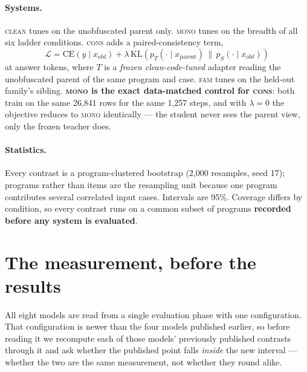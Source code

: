 \documentclass[sigconf,review,anonymous]{acmart}
\begin{document}
\paragraph{Systems.} \textsc{clean} tunes on the unobfuscated parent only. \textsc{mono} tunes on
the breadth of all six ladder conditions. \textsc{cons} adds a paired-consistency term,
\[
\mathcal{L} = \mathrm{CE}(y \mid x_{\text{obf}})
  + \lambda\,\mathrm{KL}\!\left(p_{T}(\cdot \mid x_{\text{parent}}) \,\|\, p_{S}(\cdot \mid x_{\text{obf}})\right)
\]
at answer tokens, where $T$ is a \emph{frozen clean-code-tuned} adapter reading the unobfuscated
parent of the same program and case. \textsc{fam} tunes on the held-out family's sibling.
\textbf{\textsc{mono} is the exact data-matched control for \textsc{cons}}: both train on the same
26{,}841 rows for the same 1{,}257 steps, and with $\lambda=0$ the objective reduces to
\textsc{mono} identically --- the student never sees the parent view, only the frozen teacher does.

\paragraph{Statistics.} Every contrast is a program-clustered bootstrap (2{,}000 resamples, seed
17); programs rather than items are the resampling unit because one program contributes several
correlated input cases. Intervals are 95\%. Coverage differs by condition, so every contrast runs
on a common subset of programs \textbf{recorded before any system is evaluated}.

\section{The measurement, before the results}
\label{sec:grid}

All eight models are read from a single evaluation phase with one configuration. That configuration
is newer than the four models published earlier, so before reading it we recompute each of those
models' previously published contrasts through it and ask whether the published point falls
\emph{inside} the new interval --- whether the two are the same measurement, not whether they round
alike.

\begin{table}[t]\centering\small
\caption{The uniform grid reproduces every previously published value it was checked against, so a
departure in Table~\ref{tab:panel} is a property of the model and not of the configuration.}
\label{tab:grid}

\end{table}
\end{document}
